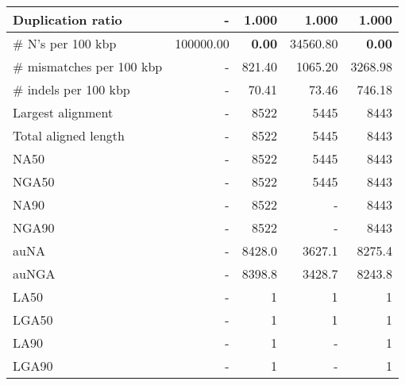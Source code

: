 \documentclass[12pt,a4paper]{article}
\begin{document}
\begin{table}[ht]
\begin{center}
\begin{tabular}{|l*{4}{|r}|}
Duplication ratio & - & 1.000 & 1.000 & 1.000 \\ \hline
\# N's per 100 kbp & 100000.00 & {\bf 0.00} & 34560.80 & {\bf 0.00} \\ \hline
\# mismatches per 100 kbp & - & 821.40 & 1065.20 & 3268.98 \\ \hline
\# indels per 100 kbp & - & 70.41 & 73.46 & 746.18 \\ \hline
Largest alignment & - & 8522 & 5445 & 8443 \\ \hline
Total aligned length & - & 8522 & 5445 & 8443 \\ \hline
NA50 & - & 8522 & 5445 & 8443 \\ \hline
NGA50 & - & 8522 & 5445 & 8443 \\ \hline
NA90 & - & 8522 & - & 8443 \\ \hline
NGA90 & - & 8522 & - & 8443 \\ \hline
auNA & - & 8428.0 & 3627.1 & 8275.4 \\ \hline
auNGA & - & 8398.8 & 3428.7 & 8243.8 \\ \hline
LA50 & - & 1 & 1 & 1 \\ \hline
LGA50 & - & 1 & 1 & 1 \\ \hline
LA90 & - & 1 & - & 1 \\ \hline
LGA90 & - & 1 & - & 1 \\ \hline
\end{tabular}
\end{center}
\end{table}
\end{document}
